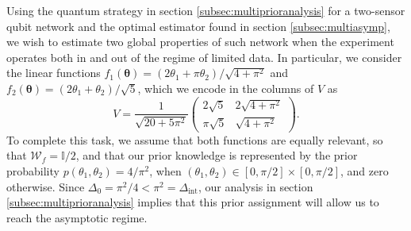 Using the quantum strategy in section \ref{subsec:multiprioranalysis} for a two-sensor qubit network  and the optimal estimator found in section \ref{subsec:multiasymp}, we wish to estimate two global properties of such network when the experiment operates both in and out of the regime of limited data. In particular, we consider the linear functions $f_1(\boldsymbol{\theta}) = (2\theta_1 + \pi \theta_2)/\sqrt{4+\pi^2}$ and $f_2(\boldsymbol{\theta}) = (2\theta_1 + \theta_2)/\sqrt{5}$, which we encode in the columns of $V$ as
\begin{equation}
V = \frac{1}{\sqrt{20 + 5\pi^2}}
\begin{pmatrix}
2\sqrt{5} & 2\sqrt{4+\pi^2}\\
\pi \sqrt{5} & \sqrt{4+\pi^2}
\end{pmatrix}.
\label{funlimiteddata}
\end{equation}
To complete this task, we assume that both functions are equally relevant, so that $\mathcal{W}_f = \mathbb{I}/2$, and that our prior knowledge is represented by the prior probability $p(\theta_1, \theta_2) = 4/\pi^2$, when $(\theta_1, \theta_2) \in [0, \pi/2]\times[0, \pi/2]$, and zero otherwise. Since $\Delta_0 = \pi^2/4 < \pi^2 = \Delta_\mathrm{int}$, our analysis in section \ref{subsec:multiprioranalysis} implies that this prior assignment will allow us to reach the asymptotic regime.

